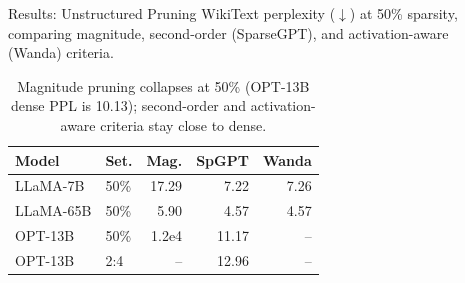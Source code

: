 \documentclass[final]{beamer}
\newlength{\sepwid}
\newlength{\onecolwid}
\newlength{\twocolwid}
\begin{document}
\begin{frame}[t]
\begin{columns}[t]
\begin{column}{\onecolwid}
\begin{block}{Results: Unstructured Pruning}
WikiText perplexity ($\downarrow$) at 50\% sparsity, comparing magnitude,
second-order (SparseGPT), and activation-aware (Wanda) criteria.
\begin{table}
\centering
\renewcommand{\arraystretch}{1.25}\small
\begin{tabular}{llrrr}
\toprule
\textbf{Model} & \textbf{Set.} & \textbf{Mag.} & \textbf{SpGPT} & \textbf{Wanda} \\
\midrule
LLaMA-7B  & 50\%  & 17.29 & 7.22 & 7.26 \\
LLaMA-65B & 50\%  & 5.90  & 4.57 & 4.57 \\
OPT-13B   & 50\%  & 1.2e4 & 11.17 & -- \\
OPT-13B   & 2:4   & --    & 12.96 & -- \\
\bottomrule
\end{tabular}
\caption{Magnitude pruning collapses at 50\% (OPT-13B dense PPL is 10.13);
second-order and activation-aware criteria stay close to dense.}
\end{table}
\end{block}

\end{column}

\begin{column}{\sepwid}\end{column} %

\begin{column}{\twocolwid}

\begin{columns}[t,totalwidth=\twocolwid]


\end{columns}
\end{column}
\end{columns}
\end{frame}
\end{document}
